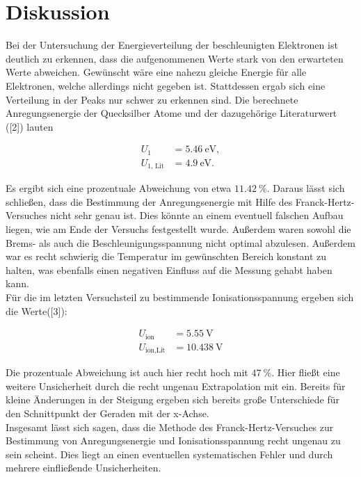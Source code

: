 \section{Diskussion}
\label{sec:Diskussion}

Bei der Untersuchung der Energieverteilung der beschleunigten Elektronen ist deutlich zu 
erkennen, dass die aufgenommenen Werte stark von den erwarteten Werte abweichen. Gewünscht wäre 
eine nahezu gleiche Energie für alle Elektronen, welche allerdings nicht gegeben ist. Stattdessen
ergab sich eine Verteilung in der Peaks nur schwer zu erkennen sind. 
Die berechnete Anregungsenergie der Quecksilber Atome und der dazugehörige Literaturwert ([2])
lauten 

\begin{align*}
U_1 &= \SI{5.46}{\eV},\\
U_\text{1, Lit} &= \SI{4.9}{\eV}.
\end{align*}

Es ergibt sich eine prozentuale Abweichung von etwa $\SI{11.42}{\percent}$. Daraus lässt sich schließen, 
dass die Bestimmung der Anregungsenergie mit Hilfe des Franck-Hertz-Versuches nicht sehr genau ist. Dies
könnte an einem eventuell falschen Aufbau liegen, wie am Ende der Versuchs festgestellt wurde. Außerdem 
waren sowohl die Brems- als auch die Beschleunigungsspannung nicht optimal abzulesen. Außerdem war es 
recht schwierig die Temperatur im gewünschten Bereich konstant zu halten, was ebenfalls einen negativen 
Einfluss auf die Messung gehabt haben kann. \\
Für die im letzten Versuchsteil zu bestimmende Ionisationsspannung ergeben sich die Werte([3]):

\begin{align*}
U_\text{ion} &= \SI{5.55}{\volt}\\
U_\text{ion,Lit} &= \SI{10.438}{\volt}
\end{align*}

Die prozentuale Abweichung ist auch hier recht hoch mit $\SI{47}{\percent}$. Hier fließt eine weitere 
Unsicherheit durch die recht ungenau Extrapolation mit ein. Bereits für kleine Änderungen in der 
Steigung ergeben sich bereits große Unterschiede für den Schnittpunkt der Geraden mit der x-Achse. \\
Insgesamt lässt sich sagen, dass die Methode des Franck-Hertz-Versuches zur Bestimmung von 
Anregungsenergie und Ionisationsspannung recht ungenau zu sein scheint. Dies liegt an einen 
eventuellen systematischen Fehler und durch mehrere einfließende Unsicherheiten. 